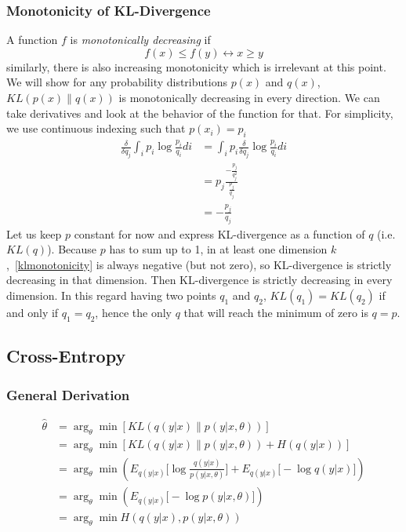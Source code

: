 \documentclass{book}
\numberwithin{equation}{subsection}
\begin{document}
\subsubsection{Monotonicity of KL-Divergence}
A function $f$ is \textit{monotonically decreasing} if
\begin{equation}
    f(x) \leq f(y) \longleftrightarrow x \geq y
\end{equation}
similarly, there is also increasing monotonicity which is irrelevant at this point. We will show for any probability distributions $p(x)$ and $q(x)$, $KL(p(x)\parallel q(x))$ is monotonically decreasing in every direction. We can take derivatives and look at the behavior of the function for that. For simplicity, we use continuous indexing such that $p(x_i)=p_i$ 
\begin{align}
    \frac{\delta}{\delta q_j}\int_i p_i\log\frac{p_i}{q_i} di &= \int_i p_i\frac{\delta}{\delta q_j}\log\frac{p_i}{q_i} di\\
    &= p_j\frac{-\frac{p_j}{q_j^2}}{\frac{p_j}{q_j}}\\
    &= -\frac{p_j}{q_j} \label{klmonotonicity}
\end{align}
Let us keep $p$ constant for now and express KL-divergence as a function of $q$ (i.e. $KL(q)$). Because $p$ has to sum up to 1, in at least one dimension $k$,~\ref{klmonotonicity} is always negative (but not zero), so KL-divergence is strictly decreasing in that dimension. Then KL-divergence is strictly decreasing in every dimension. In this regard having two points $q_1$ and $q_2$, $KL(q_1)=KL(q_2)$ if and only if $q_1=q_2$, hence the only $q$ that will reach the minimum of zero is $q=p$.
\subsection{Cross-Entropy}
\subsubsection{General Derivation}
\begin{align}
    \hat{\theta} 
    &= \arg_\theta \min[KL(q(y|x) \parallel p(y|x,\theta))]\\
    &= \arg_\theta \min[ KL(q(y|x) \parallel p(y|x,\theta)) + H(q(y|x))]\\
    &= \arg_\theta \min \left( E_{q(y|x)}\Big[\log\frac{q(y|x)}{p(y|x,\theta)}\Big] + E_{q(y|x)}\Big[-\log q(y|x)\Big]\right)\\
    &= \arg_\theta \min \left( E_{q(y|x)}\Big[-\log p(y|x,\theta)\Big]\right)\label{ce_derivation_res}\\
    &= \arg_\theta \min H(q(y|x), p(y|x,\theta))
\end{align}
\end{document}
